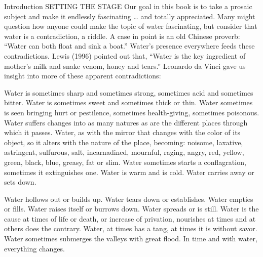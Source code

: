 \documentclass{article}
\begin{document}
\hfill\break

Introduction SETTING THE STAGE Our goal in this book is to take a
prosaic subject and make it endlessly fascinating \ldots{} and totally
appreciated. Many might question how anyone could make the topic of
water fascinating, but consider that water is a contradiction, a riddle.
A case in point is an old Chinese proverb: ``Water can both float and
sink a boat.'' Water's presence everywhere feeds these contradictions.
Lewis (1996) pointed out that, ``Water is the key ingredient of mother's
milk and snake venom, honey and tears.'' Leonardo da Vinci gave us
insight into more of these apparent contradictions:

Water is sometimes sharp and sometimes strong, sometimes acid and
sometimes bitter. Water is sometimes sweet and sometimes thick or thin.
Water sometimes is seen bringing hurt or pestilence, sometimes
health-giving, sometimes poisonous. Water suffers changes into as many
natures as are the different places through which it passes. Water, as
with the mirror that changes with the color of its object, so it alters
with the nature of the place, becoming: noisome, laxative, astringent,
sulfurous, salt, incarnadined, mournful, raging, angry, red, yellow,
green, black, blue, greasy, fat or slim. Water sometimes starts a
conflagration, sometimes it extinguishes one. Water is warm and is cold.
Water carries away or sets down.

Water hollows out or builds up. Water tears down or establishes. Water
empties or fills. Water raises itself or burrows down. Water spreads or
is still. Water is the cause at times of life or death, or increase of
privation, nourishes at times and at others does the contrary. Water, at
times has a tang, at times it is without savor. Water sometimes
submerges the valleys with great flood. In time and with water,
everything changes.
\end{document}
